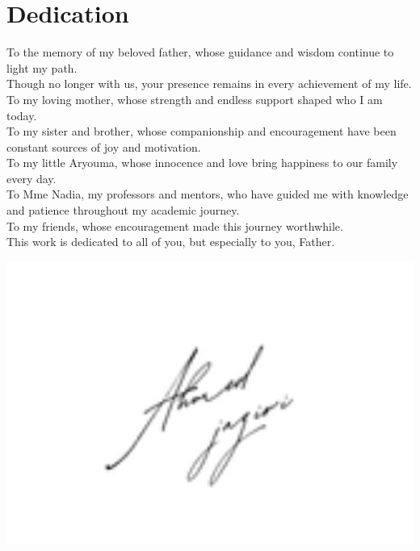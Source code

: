 \chapter*{\centering Dedication}

\vspace*{0cm}

\begin{center}
\begin{minipage}{0.9\textwidth}
    \begin{center}
        \itshape\large
        
        To the memory of my beloved father, whose guidance and wisdom continue to light my path.\\
        Though no longer with us, your presence remains in every achievement of my life.\\
        \vspace{0.8cm}
        To my loving mother, whose strength and endless support shaped who I am today.\\
        \vspace{0.5cm}
        To my sister and brother, whose companionship and encouragement have been constant sources of joy and motivation.\\
        \vspace{0.5cm}
        To my little Aryouma, whose innocence and love bring happiness to our family every day.\\
        \vspace{0.5cm}
        To Mme Nadia, my professors and mentors, who have guided me with knowledge and patience throughout my academic journey.\\
        \vspace{0.5cm}
        To my friends, whose encouragement made this journey worthwhile.\\
        \vspace{0.8cm}
        This work is dedicated to all of you, but especially to you, Father.
    \end{center}
\end{minipage}
\end{center}

\vspace{1cm}

\begin{flushright}
    \begin{minipage}{0.3\textwidth}
        \centering
        \includegraphics[width=1\textwidth]{images/Ahmed jaziri signature.png}\\
    \end{minipage}
\end{flushright}

\thispagestyle{empty} 